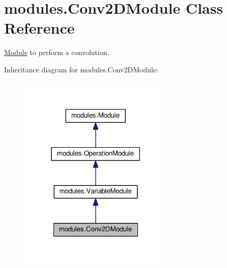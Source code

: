\hypertarget{classmodules_1_1_conv2_d_module}{}\section{modules.\+Conv2\+D\+Module Class Reference}
\label{classmodules_1_1_conv2_d_module}


\hyperlink{classmodules_1_1_module}{Module} to perform a convolution.  




Inheritance diagram for modules.\+Conv2\+D\+Module\+:\nopagebreak
\begin{figure}[H]
\begin{center}
\leavevmode
\includegraphics[width=210pt]{classmodules_1_1_conv2_d_module__inherit__graph}
\end{center}
\end{figure}
